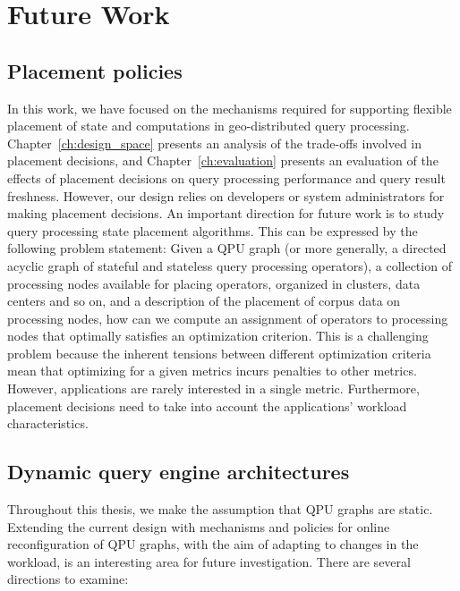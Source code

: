 \section{Future Work}

\subsection{Placement policies}

In this work, we have focused on the mechanisms required for supporting flexible placement of state
and computations in geo-distributed query processing.
Chapter~\ref{ch:design_space} presents an analysis of the trade-offs involved in placement decisions,
and Chapter~\ref{ch:evaluation} presents an evaluation of the effects of placement decisions on query processing performance
and query result freshness.
However, our design relies on developers or system administrators for making placement decisions.
An important direction for future work is to study query processing state placement algorithms.
This can be expressed by the following problem statement:
Given a QPU graph (or more generally, a directed acyclic graph of stateful and stateless query processing operators),
a collection of processing nodes available for placing operators, organized in clusters, data centers and so on,
and a description of the placement of corpus data on processing nodes,
how can we compute an assignment of operators to processing nodes that optimally satisfies an optimization criterion.
This is a challenging problem because the inherent tensions between different optimization criteria mean that
optimizing for a given metrics incurs penalties to other metrics.
However, applications are rarely interested in a single metric.
Furthermore, placement decisions need to take into account the applications' workload characteristics.

\subsection{Dynamic query engine architectures}

Throughout this thesis, we make the assumption that QPU graphs are static.
Extending the current design with mechanisms and policies for online reconfiguration of QPU graphs,
with the aim of adapting to changes in the workload, is an interesting area for future investigation.
There are several directions to examine:

